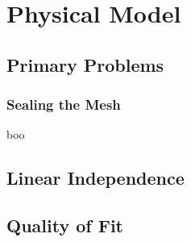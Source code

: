 % 

\section{Physical Model}

\subsection{Primary Problems}
\begin{frame}\frametitle{Sealing the Mesh}
boo
\end{frame}


\subsection{Linear Independence}
	
\subsection{Quality of Fit}

\endinput  %
